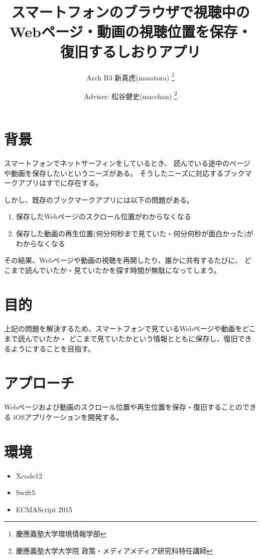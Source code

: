 \documentclass[a4j,10pt]{jsarticle}
\begin{document}

\title{スマートフォンのブラウザで視聴中のWebページ・動画の視聴位置を保存・復旧するしおりアプリ}

\author{
    Arch B3 新真虎(masatora) \thanks{慶應義塾大学環境情報学部}
    \and
    Adviser: 松谷健史(macchan) \thanks{慶應義塾大学大学院 政策・メディアメディア研究科特任講師}
}

\maketitle
\thispagestyle{empty}

\section{背景}
スマートフォンでネットサーフィンをしているとき、
読んでいる途中のページや動画を保存したいというニーズがある。
そうしたニーズに対応するブックマークアプリはすでに存在する\cite{Pocket}\cite{instapaper}。

しかし、既存のブックマークアプリには以下の問題がある。
\begin{enumerate}
\item 保存したWebページのスクロール位置がわからなくなる
\item 保存した動画の再生位置(何分何秒まで見ていた・何分何秒が面白かった)がわからなくなる
\end{enumerate}

その結果、Webページや動画の視聴を再開したり、誰かに共有するたびに、
どこまで読んでいたか・見ていたかを探す時間が無駄になってしまう。


\section{目的}
上記の問題を解決するため、スマートフォンで見ているWebページや動画をどこまで読んでいたか・
どこまで見ていたかという情報とともに保存し、復旧できるようにすることを目指す。

\section{アプローチ}
Webページおよび動画のスクロール位置や再生位置を保存・復旧することのできる
iOSアプリケーションを開発する\cite{shiori-web-for-safari}。

\section{環境}
\begin{itemize}
\item Xcode12
\item Swift5
\item ECMAScript 2015
\end{itemize}
\end{document}
